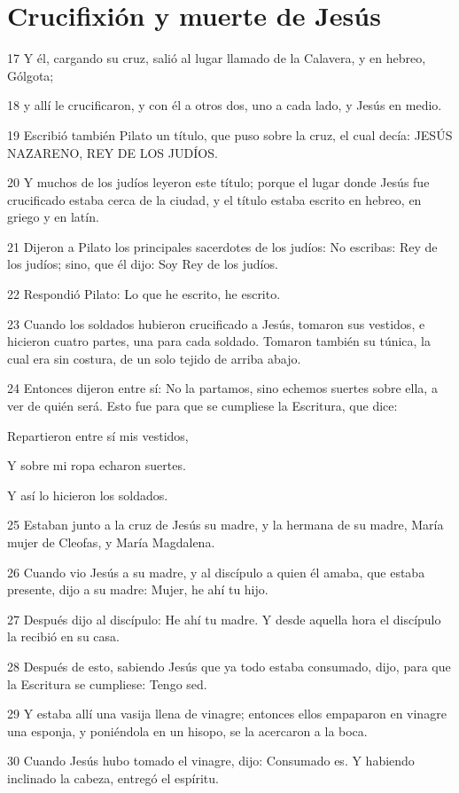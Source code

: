 \section*{Crucifixión y muerte de Jesús}

\par 17 Y él, cargando su cruz, salió al lugar llamado de la Calavera, y en hebreo, Gólgota;
\par 18 y allí le crucificaron, y con él a otros dos, uno a cada lado, y Jesús en medio.
\par 19 Escribió también Pilato un título, que puso sobre la cruz, el cual decía: JESÚS NAZARENO, REY DE LOS JUDÍOS.
\par 20 Y muchos de los judíos leyeron este título; porque el lugar donde Jesús fue crucificado estaba cerca de la ciudad, y el título estaba escrito en hebreo, en griego y en latín.
\par 21 Dijeron a Pilato los principales sacerdotes de los judíos: No escribas: Rey de los judíos; sino, que él dijo: Soy Rey de los judíos.
\par 22 Respondió Pilato: Lo que he escrito, he escrito.
\par 23 Cuando los soldados hubieron crucificado a Jesús, tomaron sus vestidos, e hicieron cuatro partes, una para cada soldado. Tomaron también su túnica, la cual era sin costura, de un solo tejido de arriba abajo.
\par 24 Entonces dijeron entre sí: No la partamos, sino echemos suertes sobre ella, a ver de quién será. Esto fue para que se cumpliese la Escritura, que dice:
\par Repartieron entre sí mis vestidos,
\par Y sobre mi ropa echaron suertes.
\par Y así lo hicieron los soldados.
\par 25 Estaban junto a la cruz de Jesús su madre, y la hermana de su madre, María mujer de Cleofas, y María Magdalena.
\par 26 Cuando vio Jesús a su madre, y al discípulo a quien él amaba, que estaba presente, dijo a su madre: Mujer, he ahí tu hijo.
\par 27 Después dijo al discípulo: He ahí tu madre. Y desde aquella hora el discípulo la recibió en su casa.
\par 28 Después de esto, sabiendo Jesús que ya todo estaba consumado, dijo, para que la Escritura se cumpliese: Tengo sed.
\par 29 Y estaba allí una vasija llena de vinagre; entonces ellos empaparon en vinagre una esponja, y poniéndola en un hisopo, se la acercaron a la boca.
\par 30 Cuando Jesús hubo tomado el vinagre, dijo: Consumado es. Y habiendo inclinado la cabeza, entregó el espíritu.


